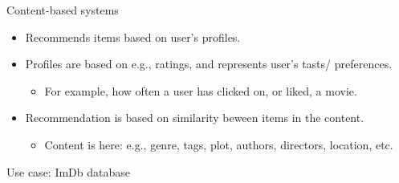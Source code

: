 \documentclass[compress]{beamer}
\begin{document}
\begin{frame}
\begin{block}{Content-based systems}
	\begin{itemize}
		\item Recommends items based on user's profiles. 
		\item Profiles are based on e.g., ratings, and represents user's tasts/ preferences. 
		\begin{itemize}
			\item For example, how often a user has clicked on, or liked, a movie. 
		\end{itemize}
		\item Recommendation is based on \alert{similarity} beween items in the content.
		\begin{itemize}
			\item Content is here: e.g., genre, tags, plot, authors, directors, location, etc. 
		\end{itemize}
	\end{itemize}
\end{block}
\end{frame}




\begin{frame}{Use case: ImDb database}
\end{frame}

\end{document}
